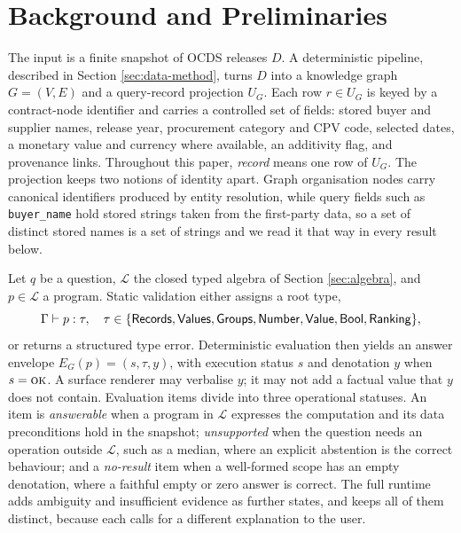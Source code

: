 \section{Background and Preliminaries}
\label{sec:problem}

The input is a finite snapshot of OCDS releases $D$.  A deterministic pipeline, described in
Section \ref{sec:data-method}, turns $D$ into a knowledge graph $G=(V,E)$ and a query-record
projection $U_G$.  Each row $r \in U_G$ is keyed by a contract-node identifier and carries a
controlled set of fields: stored buyer and supplier names, release year, procurement category and
CPV code, selected dates, a monetary value and currency where available, an additivity flag, and
provenance links.  Throughout this paper, \emph{record} means one row of $U_G$.  The projection
keeps two notions of identity apart.  Graph organisation nodes carry canonical identifiers
produced by entity resolution, while query fields such as \texttt{buyer\_name} hold stored strings
taken from the first-party data, so a set of distinct stored names is a set of strings and we read
it that way in every result below.

Let $q$ be a question, $\mathcal{L}$ the closed typed algebra of Section \ref{sec:algebra}, and
$p \in \mathcal{L}$ a program.  Static validation either assigns a root type,
\begin{equation}
  \Gamma \vdash p : \tau,
  \quad
  \tau\in\{\mathsf{Records},\mathsf{Values},\mathsf{Groups},\mathsf{Number},\mathsf{Value},\mathsf{Bool},\mathsf{Ranking}\},
\end{equation}
or returns a structured type error.  Deterministic evaluation then yields an answer envelope
$E_G(p)=(s,\tau,y)$, with execution status $s$ and denotation $y$ when $s=\textsc{ok}$.  A surface
renderer may verbalise $y$; it may not add a factual value that $y$ does not contain.  Evaluation
items divide into three operational statuses.  An item is \emph{answerable} when a program in
$\mathcal{L}$ expresses the computation and its data preconditions hold in the snapshot;
\emph{unsupported} when the question needs an operation outside $\mathcal{L}$, such as a median,
where an explicit abstention is the correct behaviour; and a \emph{no-result} item when a
well-formed scope has an empty denotation, where a faithful empty or zero answer is correct.  The
full runtime adds ambiguity and insufficient evidence as further states, and keeps all of them
distinct, because each calls for a different explanation to the user.

